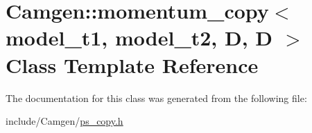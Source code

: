 \hypertarget{a00375}{\section{Camgen\-:\-:momentum\-\_\-copy$<$ model\-\_\-t1, model\-\_\-t2, D, D $>$ Class Template Reference}
\label{a00375}
}


The documentation for this class was generated from the following file\-:\begin{DoxyCompactItemize}
\item 
include/\-Camgen/\hyperlink{a00712}{ps\-\_\-copy.\-h}\end{DoxyCompactItemize}
